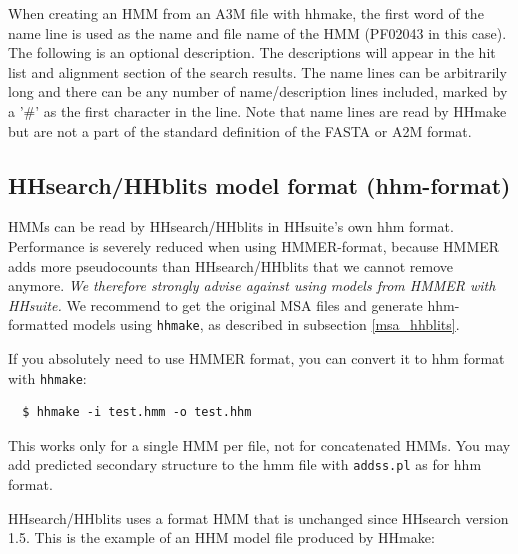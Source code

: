 \documentclass[11pt,a4paper]{article}
\begin{document}
When creating an HMM from an A3M file with hhmake, the first word of the name line is 
used as the name and file name of the HMM (PF02043 in this case). The following is an 
optional description. The descriptions will appear in the hit list and alignment section 
of the search results. The name lines can be arbitrarily long and there can be any number of 
name/description lines included, marked by a '\#' as the first character in the line. 
Note that name lines are read by HHmake but are not a part of the standard definition
of the FASTA or A2M format.
 

\subsection{HHsearch/HHblits model format (hhm-format)} \label{hhmformat}

HMMs can be read by HHsearch/HHblits in HHsuite's own hhm format.
Performance is severely reduced when using HMMER-format, because HMMER adds more pseudocounts than HHsearch/HHblits
that we cannot remove anymore. \emph{We therefore strongly advise against using models from HMMER with HHsuite.} 
We recommend to get the original MSA files and generate hhm-formatted models using \verb`hhmake`, as described in 
subsection \ref{msa_hhblits}.

If you absolutely need to use HMMER format, you can convert it to hhm format with \verb`hhmake`:
\begin{verbatim}
  $ hhmake -i test.hmm -o test.hhm
\end{verbatim}
This works only for a single HMM per file, not for concatenated HMMs. You 
may add predicted secondary structure to the hmm file with \verb`addss.pl` as for hhm format.

HHsearch/HHblits uses a format HMM that is unchanged since HHsearch version 1.5. 
This is the example of an HHM model file produced by HHmake:
\end{document}

